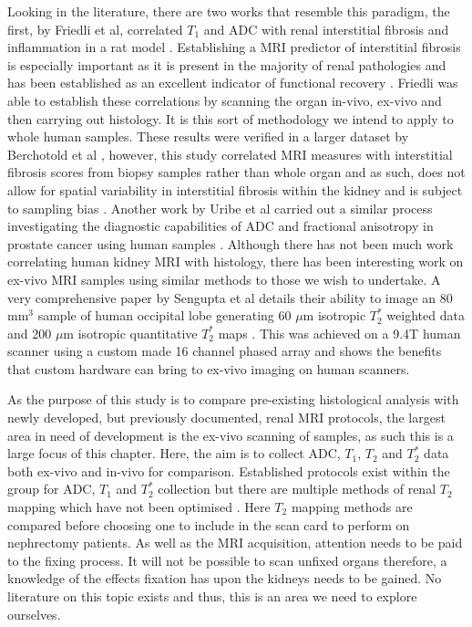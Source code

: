Looking in the literature, there are two works that resemble this paradigm, the first, by Friedli et al, correlated $T_1$ and \ac{ADC} with renal interstitial fibrosis and inflammation in a rat model \cite{friedli_new_2016}. Establishing a \ac{MRI} predictor of interstitial fibrosis is especially important as it is present in the majority of renal pathologies and has been established as an excellent indicator of functional recovery \cite{risdon_relationship_1968}. Friedli was able to establish these correlations by scanning the organ in-vivo, ex-vivo and then carrying out histology. It is this sort of methodology we intend to apply to whole human samples. These results were verified in a larger dataset by Berchotold et al \cite{berchtold_validation_2020}, however, this study correlated \ac{MRI} measures with interstitial fibrosis scores from biopsy samples rather than whole organ and as such, does not allow for spatial variability in interstitial fibrosis within the kidney and is subject to sampling bias \cite{leung_could_2017}. Another work by Uribe et al carried out a similar process investigating the diagnostic capabilities of \ac{ADC} and fractional anisotropy in prostate cancer using human samples \cite{uribe_vivo_2015}. Although there has not been much work correlating human kidney \ac{MRI} with histology, there has been interesting work on ex-vivo \ac{MRI} samples using similar methods to those we wish to undertake. A very comprehensive paper by Sengupta et al details their ability to image an 80 mm$^3$ sample of human occipital lobe generating 60 $\mu$m isotropic $T_2^*$ weighted data and 200 $\mu$m isotropic quantitative $T_2^*$ maps \cite{sengupta_high_2017}. This was achieved on a 9.4T human scanner using a custom made 16 channel phased array and shows the benefits that custom hardware can bring to ex-vivo imaging on human scanners.


As the purpose of this study is to compare pre-existing histological analysis with newly developed, but previously documented, renal \ac{MRI} protocols, the largest area in need of development is the ex-vivo scanning of samples, as such this is a large focus of this chapter. Here, the aim is to collect \ac{ADC}, $T_1$, $T_2$ and $T_2^*$ data both ex-vivo and in-vivo for comparison. Established protocols exist within the group for \ac{ADC}, $T_1$ and $T_2^*$ collection but there are multiple methods of renal $T_2$ mapping which have not been optimised \cite{wolf_magnetic_2018, franke_magnetic_2017, li_measuring_2015, zhang_reproducibility_2011}. Here $T_2$ mapping methods are compared before choosing one to include in the scan card to perform on nephrectomy patients. As well as the \ac{MRI} acquisition, attention needs to be paid to the fixing process. It will not be possible to scan unfixed organs therefore, a knowledge of the effects fixation has upon the kidneys needs to be gained. No literature on this topic exists and thus, this is an area we need to explore ourselves.

